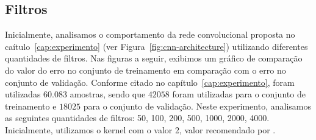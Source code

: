 \subsection{Filtros}

Inicialmente, analisamos o comportamento da rede convolucional proposta no caítulo~\ref{cap:experimento} (ver Figura~\ref{fig:cnn-architecture}) utilizando diferentes quantidades de filtros. Nas figuras a seguir, exibimos um gráfico de comparação do valor do erro no conjunto de treinamento em comparação com o erro no conjunto de validação. Conforme citado no capítulo~\ref{cap:experimento}, foram utilizadas $60.083$ amostras, sendo que $42058$ foram utilizadas para o conjunto de treinamento e $18025$ para o conjunto de validação. Neste experimento, analisamos as seguintes quantidades de filtros: 50, 100, 200, 500, 1000, 2000, 4000. Inicialmente, utilizamos o kernel com o valor 2, valor recomendado por \cite{tan-lstm-qa}.

